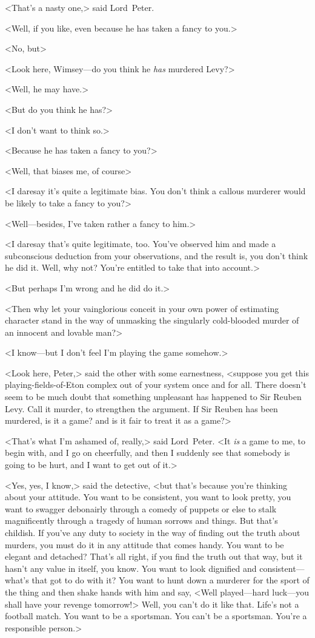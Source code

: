 <That's a nasty one,> said Lord~Peter.

<Well, if you like, even because he has taken a fancy to you.>

<No, but\longdash>

<Look here, Wimsey—do you think he \emph{has} murdered Levy?>

<Well, he may have.>

<But do you think he has?>

<I don't want to think so.>

<Because he has taken a fancy to you?>

<Well, that biases me, of course\longdash>

<I daresay it's quite a legitimate bias. You don't think a callous murderer would be likely to take a fancy to you?>

<Well—besides, I've taken rather a fancy to him.>

<I daresay that's quite legitimate, too. You've observed him and made a subconscious deduction from your observations, and the result is, you don't think he did it. Well, why not? You're entitled to take that into account.>

<But perhaps I'm wrong and he did do it.>

<Then why let your vainglorious conceit in your own power of estimating character stand in the way of unmasking the singularly cold-blooded murder of an innocent and lovable man?>

<I know—but I don't feel I'm playing the game somehow.>

<Look here, Peter,> said the other with some earnestness, <suppose you get this playing-fields-of-Eton complex out of your system once and for all. There doesn't seem to be much doubt that something unpleasant has happened to Sir Reuben Levy. Call it murder, to strengthen the argument. If Sir Reuben has been murdered, is it a game? and is it fair to treat it as a game?>

<That's what I'm ashamed of, really,> said Lord~Peter. <It \emph{is} a game to me, to begin with, and I go on cheerfully, and then I suddenly see that somebody is going to be hurt, and I want to get out of it.>

<Yes, yes, I know,> said the detective, <but that's because you're thinking about your attitude. You want to be consistent, you want to look pretty, you want to swagger debonairly through a comedy of puppets or else to stalk magnificently through a tragedy of human sorrows and things. But that's childish. If you've any duty to society in the way of finding out the truth about murders, you must do it in any attitude that comes handy. You want to be elegant and detached? That's all right, if you find the truth out that way, but it hasn't any value in itself, you know. You want to look dignified and consistent—what's that got to do with it? You want to hunt down a murderer for the sport of the thing and then shake hands with him and say, <Well played—hard luck—you shall have your revenge tomorrow!> Well, you can't do it like that. Life's not a football match. You want to be a sportsman. You can't be a sportsman. You're a responsible person.>

